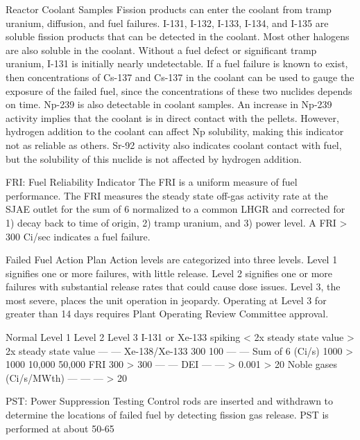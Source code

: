 \documentclass[10pt]{article}
\begin{document}
Reactor Coolant Samples
Fission products can enter the coolant from tramp uranium, diffusion, and fuel failures. I-131, I-132, I-133, I-134, and I-135 are soluble fission products that can be detected in the coolant. Most other halogens are also soluble in the coolant. Without a fuel defect or significant tramp uranium, I-131 is initially nearly undetectable. If a fuel failure is known to exist, then concentrations of Cs-137 and Cs-137 in the coolant can be used to gauge the exposure of the failed fuel, since the concentrations of these two nuclides depends on time. Np-239 is also detectable in coolant samples. An increase in Np-239 activity implies that the coolant is in direct contact with the pellets. However, hydrogen addition to the coolant can affect Np solubility, making this indicator not as reliable as others. Sr-92 activity also indicates coolant contact with fuel, but the solubility of this nuclide is not affected by hydrogen addition. 

FRI: Fuel Reliability Indicator
The FRI is a uniform measure of fuel performance. The FRI measures the steady state off-gas activity rate at the SJAE outlet for the sum of 6 normalized to a common LHGR and corrected for 1) decay back to time of origin, 2) tramp uranium, and 3) power level. A FRI > 300 Ci/sec indicates a fuel failure.

Failed Fuel Action Plan
Action levels are categorized into three levels. Level 1 signifies one or more failures, with little release. Level 2 signifies one or more failures with substantial release rates that could cause dose issues. Level 3, the most severe, places the unit operation in jeopardy. Operating at Level 3 for greater than 14 days requires Plant Operating Review Committee approval. 


Normal
Level 1
Level 2
Level 3
I-131 or Xe-133 spiking
< 2x steady state value
> 2x steady state value
---
---
Xe-138/Xe-133
 300
 100
---
---
Sum of 6 (Ci/s)
 1000
> 1000
 10,000
 50,000
FRI
 300
> 300
---
---
DEI
---
---
> 0.001
> 20%
Noble gases (Ci/s/MWth)
---
---
---
> 20%

PST: Power Suppression Testing
Control rods are inserted and withdrawn to determine the locations of failed fuel by detecting fission gas release. PST is performed at about 50-65%
\end{document}
